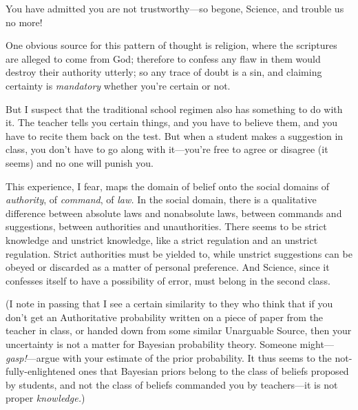 {
 You have admitted you are not trustworthy---so begone, Science,
and trouble us no more!}

{
 One obvious source for this pattern of thought is religion, where
the scriptures are alleged to come from God; therefore to confess any
flaw in them would destroy their authority utterly; so any trace of
doubt is a sin, and claiming certainty is \textit{mandatory} whether
you're certain or not.}

{
 But I suspect that the traditional school regimen also has
something to do with it. The teacher tells you certain things, and you
have to believe them, and you have to recite them back on the test. But
when a student makes a suggestion in class, you don't
have to go along with it---you're free to agree or
disagree (it seems) and no one will punish you.}

{
 This experience, I fear, maps the domain of belief onto the social
domains of \textit{authority}, of \textit{command}, of \textit{law.} In
the social domain, there is a qualitative difference between absolute
laws and nonabsolute laws, between commands and suggestions, between
authorities and unauthorities. There seems to be strict knowledge and
unstrict knowledge, like a strict regulation and an unstrict
regulation. Strict authorities must be yielded to, while unstrict
suggestions can be obeyed or discarded as a matter of personal
preference. And Science, since it confesses itself to have a
possibility of error, must belong in the second class.}

{
 (I note in passing that I see a certain similarity to they who
think that if you don't get an Authoritative
probability written on a piece of paper from the teacher in class, or
handed down from some similar Unarguable Source, then your uncertainty
is not a matter for Bayesian probability theory. Someone
might---\textit{gasp!}{}---argue with your estimate of the prior
probability. It thus seems to the not-fully-enlightened ones that
Bayesian priors belong to the class of beliefs proposed by students,
and not the class of beliefs commanded you by teachers---it is not
proper \textit{knowledge.})}

